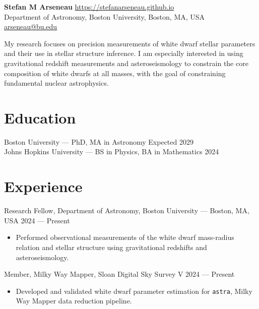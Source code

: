 \documentclass[11pt]{article}       %
\newcommand{\email}[1]{{\href{mailto:#1}{{#1}}}}
\begin{document}
\textbf{\huge Stefan M Arseneau} \hfill
\textsf{\large \href{https://stefanarseneau.github.io}{https://stefanarseneau.github.io}} \\[0.5ex]
\large Department of Astronomy, Boston University, Boston, MA, USA  \hfill \textsf{\large \email{arseneau@bu.edu}} \\[0.5ex]

\vspace{5pt}

\justifying \noindent My research focuses on precision measurements of white dwarf stellar parameters and their use in stellar structure inference. I am especially interested in using gravitational redshift measurements and asteroseismology to constrain the core composition of white dwarfs at all masses, with the goal of constraining fundamental nuclear astrophysics.

\vspace{-5pt}

\section*{Education}
Boston University --- PhD, MA in Astronomy \hfill Expected 2029 \\
\vspace{2pt}
Johns Hopkins University --- BS in Physics, BA in Mathematics \hfill 2024

\vspace{-6.5pt}

\section*{Experience}
Research Fellow, {Department of Astronomy, Boston University} --- Boston, MA, USA \hfill 2024 --- Present \\
\vspace{-9pt}
\begin{itemize}
  \item Performed observational measurements of the white dwarf mass-radius relation and stellar structure using gravitational redshifts and asteroseismology.
\end{itemize}

Member, {Milky Way Mapper, Sloan Digital Sky Survey V} \hfill 2024 --- Present \\
\vspace{-9pt}
\begin{itemize}
  \item Developed and validated white dwarf parameter estimation for \texttt{astra}, Milky Way Mapper data reduction pipeline.
\end{itemize}
\end{document}
